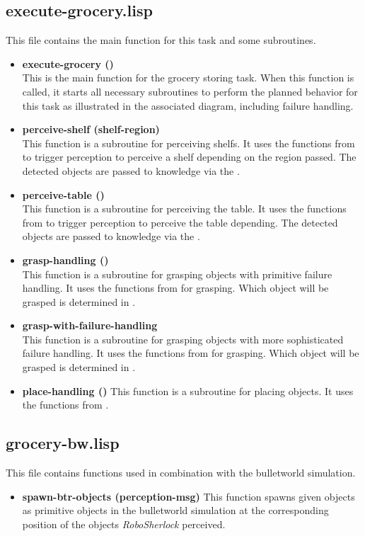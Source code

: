 \documentclass[main.tex]{subfiles}
\begin{document}
		\subsection{execute-grocery.lisp}
		This file contains the main function for this task and some subroutines.
		\begin{itemize}
			\item \textbf{execute-grocery ()} \\
			This is the main function for the grocery storing task. When this function is called, it starts all necessary subroutines to perform the planned behavior for this task as illustrated in the associated diagram, including failure handling.
			\item \textbf{perceive-shelf (shelf-region)} \\
			This function is a subroutine for perceiving shelfs. It uses the functions from  to trigger perception to perceive a shelf depending on the region passed. The detected objects are passed to knowledge via the .
			\item \textbf{perceive-table ()} \\
			This function is a subroutine for perceiving the table. It uses the functions from  to trigger perception to perceive the table depending. The detected objects are passed to knowledge via the .
			\item \textbf{grasp-handling ()} \\
			This function is a subroutine for grasping objects with primitive failure handling. It uses the functions from  for grasping. Which object will be grasped is determined in .
			\item \textbf{grasp-with-failure-handling} \\
			This function is a subroutine for grasping objects with more sophisticated failure handling. It uses the functions from  for grasping. Which object will be grasped is determined in .
			\item \textbf{place-handling ()}
			This function is a subroutine for placing objects. It uses the functions from .
		\end{itemize}
		
		\subsection{grocery-bw.lisp}
		This file contains functions used in combination with the bulletworld simulation.
		\begin{itemize}
			\item \textbf{spawn-btr-objects (perception-msg)}
			This function spawns given objects as primitive objects in the bulletworld simulation at the corresponding position of the objects \textit{RoboSherlock} perceived.  
		\end{itemize}
	  	
\end{document}
